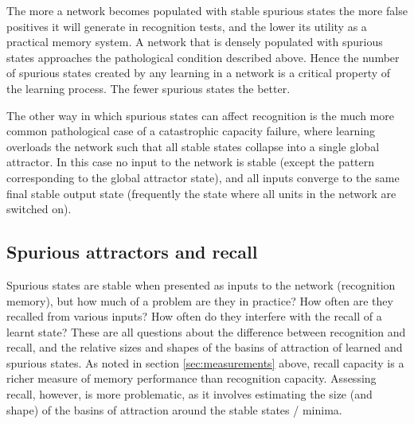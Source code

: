 The more a network becomes populated with stable spurious states the more false positives it will generate in recognition tests, and the lower its utility as a practical memory system.  A network that is densely populated with spurious states approaches the pathological condition described above.  Hence the number of spurious states created by any learning in a network is a critical property of the learning process.  The fewer spurious states the better.

The other way in which spurious states can affect recognition is the much more common pathological case of a catastrophic capacity failure, where learning overloads the network such that all stable states collapse into a single global attractor.  In this case no input to the network is stable (except the pattern corresponding to the global attractor state), and all inputs converge to the same final stable output state (frequently the state where all units in the network are switched on).



\subsection{Spurious attractors and recall}  %


Spurious states are stable when presented as inputs to the network (recognition memory), but how much of a problem are they in practice?  How often are they recalled from various inputs?  How often do they interfere with the recall of a learnt state?  These are all questions about the difference between recognition and recall, and the relative sizes and shapes of the basins of attraction of learned and spurious states.  As noted in section \ref{sec:measurements} above, recall capacity is a richer measure of memory performance than recognition capacity.  Assessing recall, however, is more problematic, as it involves estimating the size (and shape) of the basins of attraction around the stable states / minima.


